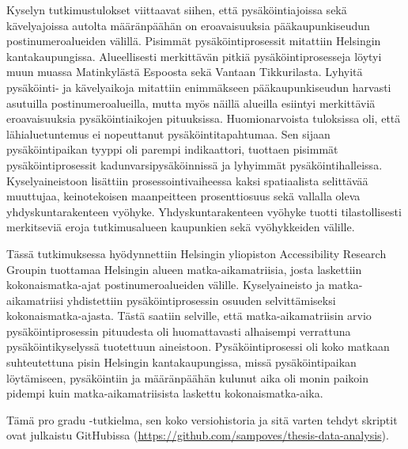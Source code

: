 Kyselyn tutkimustulokset viittaavat siihen, että pysäköintiajoissa sekä kävelyajoissa autolta määränpäähän on eroavaisuuksia pääkaupunkiseudun postinumeroalueiden välillä. Pisimmät pysäköintiprosessit mitattiin Helsingin kantakaupungissa. Alueellisesti merkittävän pitkiä pysäköintiprosesseja löytyi muun muassa Matinkylästä Espoosta sekä Vantaan Tikkurilasta. Lyhyitä pysäköinti- ja kävelyaikoja mitattiin enimmäkseen pääkaupunkiseudun harvasti asutuilla postinumeroalueilla, mutta myös näillä alueilla esiintyi merkittäviä eroavaisuuksia pysäköintiaikojen pituuksissa. Huomionarvoista tuloksissa oli, että lähialuetuntemus ei nopeuttanut pysäköintitapahtumaa. Sen sijaan pysäköintipaikan tyyppi oli parempi indikaattori, tuottaen pisimmät pysäköintiprosessit kadunvarsipysäköinnissä ja lyhyimmät pysäköintihalleissa. Kyselyaineistoon lisättiin prosessointivaiheessa kaksi spatiaalista selittävää muuttujaa, keinotekoisen maanpeitteen prosenttiosuus sekä vallalla oleva yhdyskuntarakenteen vyöhyke. Yhdyskuntarakenteen vyöhyke tuotti tilastollisesti merkitseviä eroja tutkimusalueen kaupunkien sekä vyöhykkeiden välille.

Tässä tutkimuksessa hyödynnettiin Helsingin yliopiston Accessibility Research Groupin tuottamaa Helsingin alueen matka-aikamatriisia, josta laskettiin kokonaismatka-ajat postinumeroalueiden välille. Kyselyaineisto ja matka-aikamatriisi yhdistettiin pysäköintiprosessin osuuden selvittämiseksi kokonaismatka-ajasta. Tästä saatiin selville, että matka-aikamatriisin arvio pysäköintiprosessin pituudesta oli huomattavasti alhaisempi verrattuna pysäköintikyselyssä tuotettuun aineistoon. Pysäköintiprosessi oli koko matkaan suhteutettuna pisin Helsingin kantakaupungissa, missä pysäköintipaikan löytämiseen, pysäköintiin ja määränpäähän kulunut aika oli monin paikoin pidempi kuin matka-aikamatriisista laskettu kokonaismatka-aika.

Tämä pro gradu -tutkielma, sen koko versiohistoria ja sitä varten tehdyt skriptit ovat julkaistu GitHubissa (\textcolor{blue}{\url{https://github.com/sampoves/thesis-data-analysis}}).